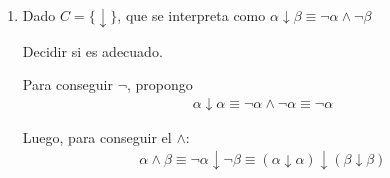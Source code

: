 \begin{enumerate}
\begin{proof}
\begin{enumerate}
                \item $\alpha = (\beta_1 \to \beta_2)$
                    \begin{gather*}
                        c(\alpha) = \underbrace{c(\beta_1)}_{\geq 0} 
                        + \underbrace{c(\beta_2)}_{\geq 0} + 1 = n+1 \\
                        c(\beta_i) \leq n \notamath{$i \in \{ 1,2 \}$}\\
                        \implies  v_f(\beta_i) = 1 \notamath{Por HI}\\
                        \implies \dashbox{$v_f(\alpha) 
                            = \max \{ 1-v_f(\beta_1), v_f(\beta_2) \}
                        = 1$}
                    \end{gather*}
            \end{enumerate}

            Sea $\alpha = (p_1 \wedge \neg p_1) \in F$. Supongo $C$ adecuado.
            \begin{gather*}
                \implies \exists \; \beta \in F_C/ \beta \equiv \alpha \\
                \implies \underbrace{v_f(\alpha)}_{=1} 
                = \underbrace{v_f(\beta)}_{=0} = 1
            \end{gather*}

            ¡Absurdo!
            Pues $\alpha$ es una contradicción.

            El absurdo vino de suponer que el conjunto de conectivos es
            adecuado.
            \begin{center}
            \end{center}

        \end{proof}

    \item Dado $C = \{ \downarrow \}$, que se interpreta como 
        $\alpha \downarrow \beta \equiv \neg \alpha \wedge \neg \beta$

        Decidir si es adecuado.

        Para conseguir $\neg$, propongo
        \begin{gather*}
            \alpha \downarrow \alpha \equiv
             \neg \alpha \wedge \neg \alpha \equiv
             \neg \alpha
        \end{gather*}

        Luego, para conseguir el $\wedge$:
        \begin{gather*}
            \alpha \wedge \beta \equiv
            \neg \alpha \downarrow \neg \beta \equiv
            (\alpha \downarrow \alpha) \downarrow (\beta \downarrow \beta)
        \end{gather*}


\end{enumerate}
